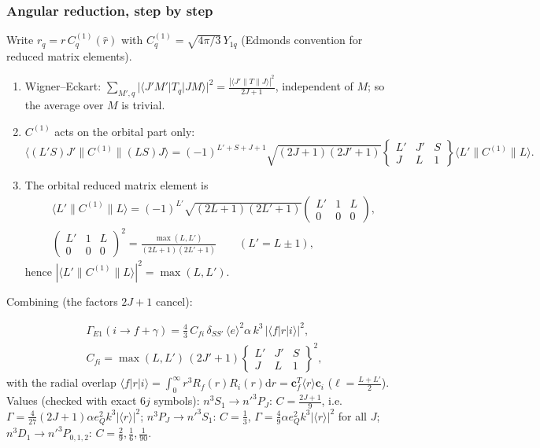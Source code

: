 \documentclass[11pt,a4paper]{article}
\numberwithin{equation}{section}
\theoremstyle{definition}
\theoremstyle{plain}
\theoremstyle{remark}
\newenvironment{keyresult}[1][Key result]{\begin{tcolorbox}[keybox,title={\small\bfseries #1},fonttitle=\small,coltitle=white,colbacktitle=MidnightBlue!70]}{\end{tcolorbox}}
\numberwithin{algorithm}{section}
\newcommand{\dd}{\mathrm{d}}
\newcommand{\vc}{\bm c}
\begin{document}
\subsubsection{Angular reduction, step by step}
Write $r_q=r\,C^{(1)}_q(\hat r)$ with $C^{(1)}_q=\sqrt{4\pi/3}\,Y_{1q}$ (Edmonds convention for reduced matrix elements).
\begin{enumerate}[leftmargin=1.5em,itemsep=2pt]
\item Wigner--Eckart: $\sum_{M',q}|\langle J'M'|T_q|JM\rangle|^2=\frac{|\langle J'\|T\|J\rangle|^2}{2J+1}$, independent of $M$; so the average over $M$ is trivial.
\item $C^{(1)}$ acts on the orbital part only:
\[
\langle(L'S)J'\|C^{(1)}\|(LS)J\rangle=(-1)^{L'+S+J+1}\sqrt{(2J+1)(2J'+1)}\begin{Bmatrix}L'&J'&S\\J&L&1\end{Bmatrix}\langle L'\|C^{(1)}\|L\rangle .
\]
\item The orbital reduced matrix element is
\begin{gather*}
\langle L'\|C^{(1)}\|L\rangle=(-1)^{L'}\sqrt{(2L+1)(2L'+1)}\begin{pmatrix}L'&1&L\\0&0&0\end{pmatrix},\\
\begin{pmatrix}L'&1&L\\0&0&0\end{pmatrix}^2=\frac{\max(L,L')}{(2L+1)(2L'+1)}\qquad(L'=L\pm1),
\end{gather*}
hence $|\langle L'\|C^{(1)}\|L\rangle|^2=\max(L,L')$.
\end{enumerate}
Combining (the factors $2J+1$ cancel):
\begin{keyresult}[E1 width]
\begin{gather}
\Gamma_{E1}(i\to f+\gamma)=\frac43\,C_{fi}\,\delta_{SS'}\,\langle e\rangle^2\alpha\,k^3\,\big|\langle f|r|i\rangle\big|^2,\\
C_{fi}=\max(L,L')\,(2J'+1)\begin{Bmatrix}L'&J'&S\\J&L&1\end{Bmatrix}^2,\nonumber
\end{gather}
with the radial overlap $\langle f|r|i\rangle=\int_0^\infty r^3R_f(r)R_i(r)\dd r=\vc_f^T\langle r\rangle\vc_i$ ($\ell=\frac{L+L'}2$). Values (checked with exact $6j$ symbols):
$n^3S_1\to n'^3P_J$: $C=\frac{2J+1}9$, i.e.\ $\Gamma=\frac4{27}(2J+1)\alpha e_Q^2k^3|\langle r\rangle|^2$;
$n^3P_J\to n'^3S_1$: $C=\frac13$, $\Gamma=\frac49\alpha e_Q^2k^3|\langle r\rangle|^2$ for all $J$;
$n^3D_1\to n'^3P_{0,1,2}$: $C=\frac29,\frac16,\frac1{90}$.
\end{keyresult}
\end{document}

